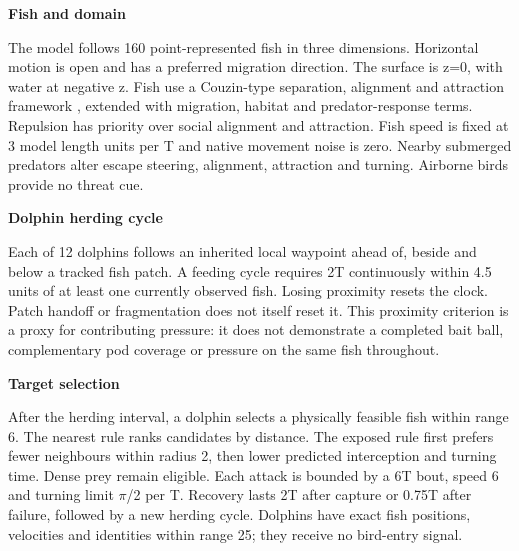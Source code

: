 \documentclass[10pt,a4paper]{article}
\begin{document}
\begin{minipage}[t]{238.10999999999999pt}\vspace{0pt}
\textbf{Fish and domain}\par The model follows 160 point-represented fish in three dimensions. Horizontal motion is open and has a preferred migration direction. The surface is z=0, with water at negative z. Fish use a Couzin-type separation, alignment and attraction framework \citep{couzin2002}, extended with migration, habitat and predator-response terms. Repulsion has priority over social alignment and attraction. Fish speed is fixed at 3 model length units per T and native movement noise is zero. Nearby submerged predators alter escape steering, alignment, attraction and turning. Airborne birds provide no threat cue.\par\smallskip
\textbf{Dolphin herding cycle}\par Each of 12 dolphins follows an inherited local waypoint ahead of, beside and below a tracked fish patch. A feeding cycle requires 2T continuously within 4.5 units of at least one currently observed fish. Losing proximity resets the clock. Patch handoff or fragmentation does not itself reset it. This proximity criterion is a proxy for contributing pressure: it does not demonstrate a completed bait ball, complementary pod coverage or pressure on the same fish throughout.\par\smallskip
\textbf{Target selection}\par After the herding interval, a dolphin selects a physically feasible fish within range 6. The nearest rule ranks candidates by distance. The exposed rule first prefers fewer neighbours within radius 2, then lower predicted interception and turning time. Dense prey remain eligible. Each attack is bounded by a 6T bout, speed 6 and turning limit \ensuremath{\pi}/2 per T. Recovery lasts 2T after capture or 0.75T after failure, followed by a new herding cycle. Dolphins have exact fish positions, velocities and identities within range 25; they receive no bird-entry signal.\par\smallskip
\end{minipage}
\hfill
\end{document}
